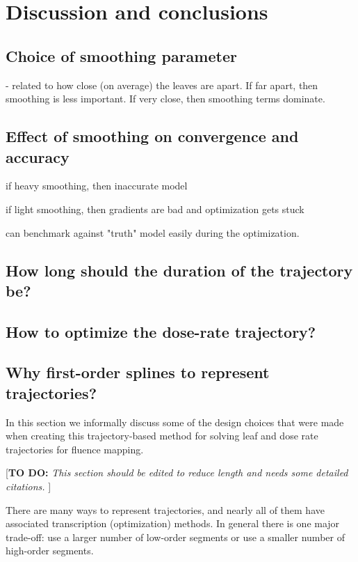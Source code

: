 \documentclass[12pt]{article}
\newcommand{\todo}[1]{{\color{lightblue}\par {[{\bf TO DO: } {\em #1}} ] \\    }}
\begin{document}
\section{Discussion and conclusions}

\subsection{Choice of smoothing parameter}
- related to how close (on average) the leaves are apart. If far apart, then smoothing is less important. If very close, then smoothing terms dominate.

\subsection{Effect of smoothing on convergence and accuracy}

if heavy smoothing, then inaccurate model

if light smoothing, then gradients are bad and optimization gets stuck

can benchmark against "truth" model easily during the optimization.

\subsection{How long should the duration of the trajectory be?}

\subsection{How to optimize the dose-rate trajectory?}

\subsection{Why first-order splines to represent trajectories?}
\label{sec:WhyUseLinearSplines}

In this section we informally discuss some of the design choices that were made when creating this
trajectory-based method for solving leaf and dose rate trajectories for fluence mapping.

\todo{This section should be edited to reduce length and needs some detailed citations.}

There are many ways to represent trajectories, and nearly all of them have associated transcription (optimization) methods.
In general there is one major trade-off:
use a larger number of low-order segments or
use a smaller number of high-order segments.
\end{document}
